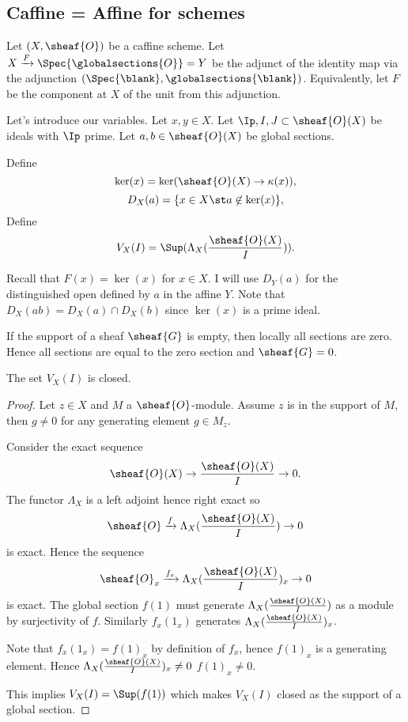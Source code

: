 \subsection{Caffine = Affine for schemes}

Let $(X,\sheaf{O})$ be a caffine scheme.
Let $X \xrightarrow{F} \Spec{\globalsections{O}} = Y$ be the adjunct of the identity map via the adjunction $(\Spec{\blank}, \globalsections{\blank})$.
Equivalently, let $F$ be the component at $X$ of the unit from this adjunction.

Let's introduce our variables.
Let $x,y\in X$. 
Let $\Ip,I,J\subset \sheaf{O}(X)$ be ideals with $\Ip$ prime.
Let $a,b\in \sheaf{O}(X)$ be global sections.

\begin{definition}
Define \[\ker(x)=\ker(\sheaf{O}(X)\rightarrow \kappa(x)),\]
\[D_X(a)=\{x\in X \st a\not\in \ker(x)\},\]
Define \[V_X(I) = \Sup(\Lambda_X(\frac{\sheaf{O}(X)}{I})).\]
\end{definition}

\begin{remark}
Recall that $F(x) = \ker(x)$ for $x\in X$.
I will use $D_Y(a)$ for the distinguished open defined by $a$ in the affine $Y$.
Note that $D_X(ab) = D_X(a) \cap D_X(b)$ since $\ker(x)$ is a prime ideal.
\end{remark}

\begin{remark}
If the support of a sheaf $\sheaf{G}$ is empty, then locally all sections are zero. Hence all sections are equal to the zero section and $\sheaf{G}=0$.
\end{remark}

\begin{lemma}
The set $V_X(I)$ is closed.
\end{lemma}

\begin{proof}
Let $z\in X$ and $M$ a $\sheaf{O}$-module. Assume $z$ is in the support of $M$, then $g\neq 0$ for any generating element $g\in M_z$. 

Consider the exact sequence 
\[\sheaf{O}(X)\rightarrow \frac{\sheaf{O}(X)}{I} \rightarrow 0.\]
The functor $\Lambda_X$ is a left adjoint hence right exact so 
\[\sheaf{O} \xrightarrow{f} \Lambda_X(\frac{\sheaf{O}(X)}{I}) \rightarrow 0\]
is exact.
Hence the sequence
\[\sheaf{O}_x \xrightarrow{f_x} \Lambda_X(\frac{\sheaf{O}(X)}{I})_x \rightarrow 0\]
is exact. 
The global section $f(1)$ must generate $\Lambda_X(\frac{\sheaf{O}(X)}{I})$ as a module by surjectivity of $f$.
Similarly $f_x(1_x)$ generates $\Lambda_X(\frac{\sheaf{O}(X)}{I})_x$.

Note that $f_x(1_x) = f(1)_x$ by definition of $f_x$, hence $f(1)_x$ is a generating element.
Hence $\Lambda_X(\frac{\sheaf{O}(X)}{I})_x \neq 0$ \iff $f(1)_x \neq 0$. 

This implies $V_X(I) = \Sup(f(1))$ which makes $V_X(I)$ closed as the support of a global section.
\end{proof}


